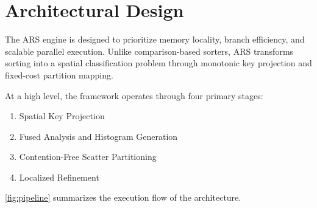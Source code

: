 \section{Architectural Design} \label{sec:methodology}
The ARS engine is designed to prioritize memory locality, branch efficiency, and scalable parallel execution.
Unlike comparison-based sorters, ARS transforms sorting into a spatial classification problem through monotonic key projection and fixed-cost partition mapping.

At a high level, the framework operates through four primary stages:
\begin{enumerate}
 \item Spatial Key Projection
 \item Fused Analysis and Histogram Generation
 \item Contention-Free Scatter Partitioning
 \item Localized Refinement
\end{enumerate}

\cref{fig:pipeline} summarizes the execution flow of the architecture.

